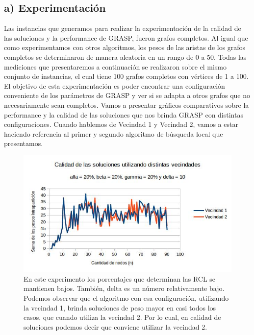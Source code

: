 \documentclass[a4paper]{article}
\begin{document}
\subsection*{a) Experimentación}
Las instancias que generamos para realizar la experimentación de la calidad de las soluciones y la performance de GRASP, fueron grafos completos. Al igual que como experimentamos con otros algoritmos, los pesos de las aristas de los grafos completos se determinaron de manera aleatoria en un rango de 0 a 50.
\newline Todas las mediciones que presentaremos a continuación se realizaron sobre el mismo conjunto de instancias, el cual tiene 100 grafos completos con vértices de 1 a 100.
\newline El objetivo de esta experimentación es poder encontrar una configuración conveniente de los parámetros de GRASP y ver si se adapta a otros grafos que no necesariamente sean completos.
\newline
\newline Vamos a presentar gráficos comparativos sobre la performance y la calidad de las soluciones que nos brinda GRASP con distintas configuraciones.
Cuando hablemos de Vecindad 1 y Vecindad 2, vamos a estar haciendo referencia al primer y segundo algoritmo de búsqueda local que presentamos.
\begin{figure}[H]
\centering
\includegraphics[scale=0.7]{20202010.jpg}\caption{En este experimento los porcentajes que determinan las RCL se mantienen bajos. También, delta es un número relativamente bajo. Podemos observar que el algoritmo con esa configuración, utilizando la vecindad 1, brinda soluciones de peso mayor en casi todos los casos, que cuando utiliza la vecindad 2. Por lo cual, en calidad de soluciones podemos decir que conviene utilizar la vecindad 2.}
\end{figure}
\end{document}
